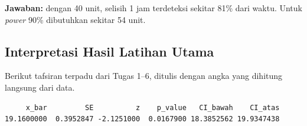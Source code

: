 \documentclass[
  indonesian,
  letterpaper,
]{book}
\newenvironment{Shaded}{\begin{snugshade}}{\end{snugshade}}
\newcommand{\AttributeTok}[1]{\textcolor[rgb]{0.40,0.45,0.13}{#1}}
\newcommand{\DecValTok}[1]{\textcolor[rgb]{0.68,0.00,0.00}{#1}}
\newcommand{\FloatTok}[1]{\textcolor[rgb]{0.68,0.00,0.00}{#1}}
\newcommand{\FunctionTok}[1]{\textcolor[rgb]{0.28,0.35,0.67}{#1}}
\newcommand{\NormalTok}[1]{\textcolor[rgb]{0.00,0.23,0.31}{#1}}
\newcommand{\OtherTok}[1]{\textcolor[rgb]{0.00,0.23,0.31}{#1}}
\newcommand{\SpecialCharTok}[1]{\textcolor[rgb]{0.37,0.37,0.37}{#1}}
\begin{document}
\textbf{Jawaban:} dengan 40 unit, selisih 1 jam terdeteksi sekitar 81\%
dari waktu. Untuk \emph{power} 90\% dibutuhkan sekitar 54 unit.

\subsection{Interpretasi Hasil Latihan
Utama}\label{interpretasi-hasil-latihan-utama}

Berikut tafsiran terpadu dari Tugas 1--6, ditulis dengan angka yang
dihitung langsung dari data.

\begin{Shaded}
\end{Shaded}

\begin{verbatim}
     x_bar         SE          z    p_value   CI_bawah    CI_atas 
19.1600000  0.3952847 -2.1251000  0.0167900 18.3852562 19.9347438 
\end{verbatim}
\end{document}
